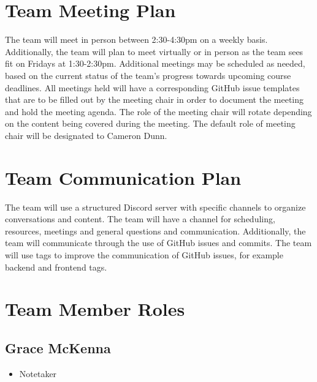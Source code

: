 \documentclass{article}
\begin{document}

\section{Team Meeting Plan}

The team will meet in person between 2:30-4:30pm on a weekly basis. 
Additionally, the team will plan to meet virtually or in person as the team sees fit on Fridays at 1:30-2:30pm.
Additional meetings may be scheduled as needed, based on the current status of the team's progress towards upcoming course deadlines. 
All meetings held will have a corresponding GitHub issue templates that are to be filled out by the meeting chair in order to document the meeting and hold the meeting agenda. 
The role of the meeting chair will rotate depending on the content being covered during the meeting. 
The default role of meeting chair will be designated to Cameron Dunn. 



\section{Team Communication Plan}

The team will use a structured Discord server with specific channels to organize conversations and content. 
The team will have a channel for scheduling, resources, meetings and general questions and communication. 
Additionally, the team will communicate through the use of GitHub issues and commits. 
The team will use tags to improve the communication of GitHub issues, for example backend and frontend tags. 

\section{Team Member Roles}

\subsection*{Grace McKenna}
\begin{itemize}
	\item Notetaker
\end{itemize}
\end{document}
